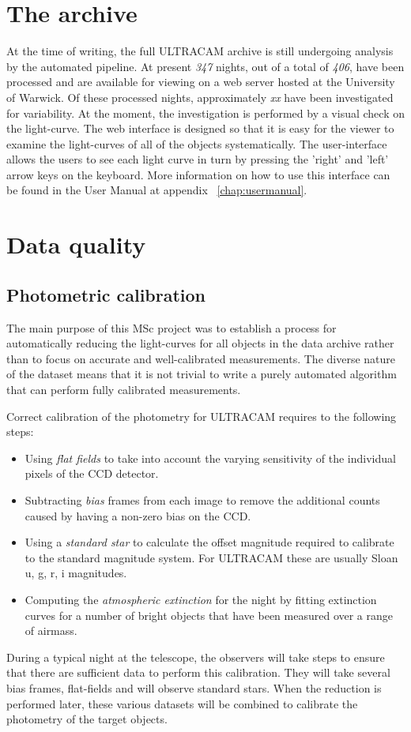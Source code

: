 \section{The archive} 

At the time of writing, the full ULTRACAM archive is still undergoing analysis by the automated pipeline. At present \emph{347} nights, out of a total of \emph{406}, have been processed and are available for viewing on a web server hosted at the University of Warwick. Of these processed nights, approximately \emph{xx} have been investigated for variability. At the moment, the investigation is performed by a visual check on the light-curve. The web interface is designed so that it is easy for the viewer to examine the light-curves of all of the objects systematically. The user-interface allows the users to see each light curve in turn by pressing the 'right' and 'left'  arrow keys on the keyboard. More information on how to use this interface can be found in the User Manual at appendix ~\ref{chap:usermanual}. 

\section{Data quality}

\subsection{Photometric calibration}
The main purpose of this MSc project was to establish a process for automatically reducing the light-curves for all objects in the data archive rather than to focus on accurate and well-calibrated measurements. The diverse nature of the dataset means that it is not trivial to write a purely automated algorithm that can perform fully calibrated measurements. 

Correct calibration of the photometry for ULTRACAM requires to the following steps:
\begin{itemize}
  \item Using \emph{flat fields} to take into account the varying sensitivity of the individual pixels of the CCD detector. 
  \item Subtracting \emph{bias} frames from each image to remove the additional counts caused by having a non-zero bias on the CCD. 
  \item Using a \emph{standard star} to calculate the offset magnitude required to calibrate to the standard magnitude system. For ULTRACAM these are usually Sloan u, g, r, i magnitudes.
  \item Computing the \emph{atmospheric extinction} for the night by fitting extinction curves for a number of bright objects that have been measured over a range of airmass. 
\end{itemize}
During a typical night at the telescope, the observers will take steps to ensure that there are sufficient data to perform this calibration. They will take several bias frames, flat-fields and will observe standard stars. When the reduction is performed later, these various datasets will be combined to calibrate the photometry of the target objects. 

